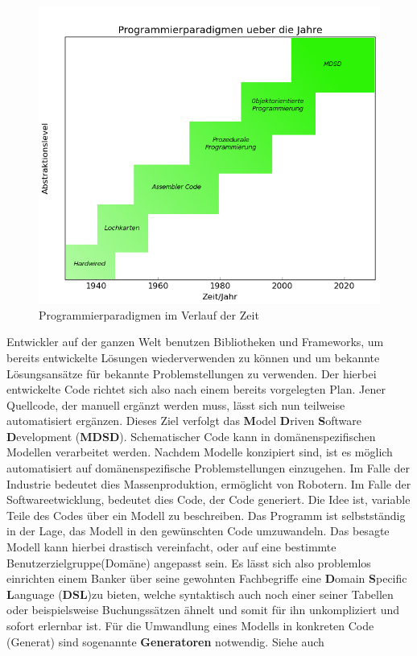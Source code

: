 \begin{figure}[h]
	\begin{center}
		\includegraphics[width = \textwidth]{Bilder/paradigmsInTime(matplotlib).png}
		\caption{Programmierparadigmen im Verlauf der Zeit}
		\label{paradigmnsintime}
	\end{center}
\end{figure}Entwickler auf der ganzen Welt benutzen Bibliotheken und Frameworks, um bereits entwickelte Lösungen wiederverwenden zu können und um bekannte Lösungsansätze für bekannte Problemstellungen zu verwenden. Der hierbei entwickelte Code richtet sich also nach einem bereits vorgelegten Plan. Jener Quellcode, der manuell ergänzt werden muss, lässt sich nun teilweise automatisiert ergänzen.  Dieses Ziel verfolgt das \textbf{M}odel \textbf{D}riven \textbf{S}oftware \textbf{D}evelopment (\textbf{MDSD}). Schematischer Code kann in domänenspezifischen Modellen verarbeitet werden. Nachdem Modelle konzipiert sind, ist es möglich automatisiert auf domänenspezifische Problemstellungen einzugehen. Im Falle der Industrie bedeutet dies Massenproduktion, ermöglicht von Robotern. Im Falle der Softwareetwicklung, bedeutet dies Code, der Code generiert. Die Idee ist, variable Teile des Codes über ein Modell zu beschreiben. Das Programm ist selbstständig in der Lage, das Modell in den gewünschten Code umzuwandeln. Das besagte Modell kann hierbei drastisch vereinfacht, oder auf eine bestimmte Benutzerzielgruppe(Domäne) angepasst sein. Es lässt sich also problemlos einrichten einem Banker über seine gewohnten Fachbegriffe eine \textbf{D}omain \textbf{S}pecific \textbf{L}anguage (\textbf{DSL})zu bieten, welche syntaktisch auch noch einer seiner Tabellen oder beispielsweise Buchungssätzen ähnelt und somit für ihn unkompliziert und sofort erlernbar ist. Für die Umwandlung eines Modells in konkreten Code (Generat) sind sogenannte \textbf{Generatoren} notwendig. 
\linebreak 
Siehe auch \citet{jorn:MDA}

